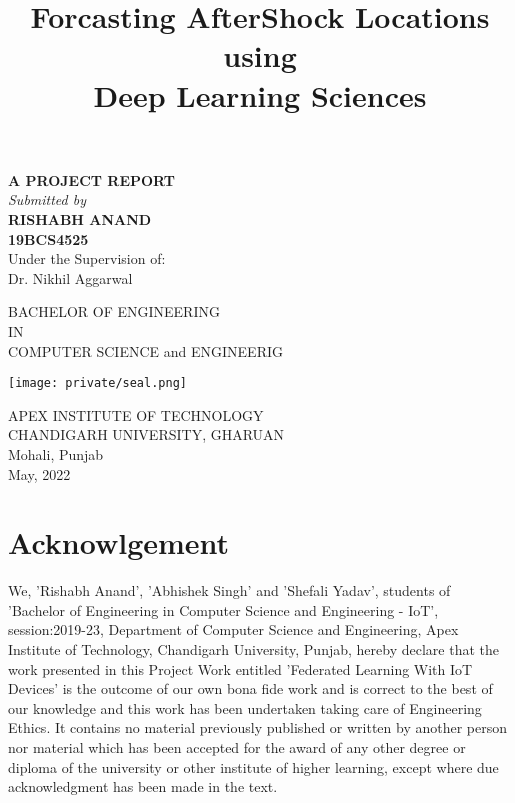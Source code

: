 \documentclass[14pt]{extarticle}
\title{Forcasting AfterShock Locations \\
using \\
Deep Learning Sciences}
\author{}
\date{}
\newcommand\frontmatter{
    \cleardoublepage
    \pagenumbering{roman}
}
\begin{document}
\frontmatter

\maketitle

\vspace{-7em}

\begin{center}
    \singlespacing
\textbf {A PROJECT REPORT} \\
\emph {Submitted by} \\
\textbf {RISHABH ANAND} \\
\textbf {19BCS4525 }   \\


\vspace{1.5em }
Under the Supervision of:\\
Dr. Nikhil Aggarwal \\

\singlespacing

BACHELOR OF ENGINEERING \\
IN \\
COMPUTER SCIENCE and ENGINEERIG

\vspace{1em}
\texttt{[image: private/seal.png]}

\singlespacing

APEX INSTITUTE OF TECHNOLOGY\\
CHANDIGARH UNIVERSITY, GHARUAN\\
Mohali, Punjab \\

\onehalfspacing
May, 2022

\end{center}
\restoregeometry

\newpage
{}
\section*{Acknowlgement}

We, 'Rishabh Anand', 'Abhishek Singh' and 'Shefali Yadav', students of 'Bachelor of Engineering in Computer Science and Engineering - IoT', session:2019-23, Department of Computer Science and Engineering, Apex Institute of Technology, Chandigarh University, Punjab, hereby declare that the work presented in this Project Work entitled 'Federated Learning With IoT Devices' is the outcome of our own bona fide work and is correct to the best of our knowledge and this work has been undertaken taking care of Engineering Ethics. It contains no material previously published or written by another person nor material which has been accepted for the award of any other degree or diploma of the university or other institute of higher learning, except where due acknowledgment has been made in the text.
\end{document}
